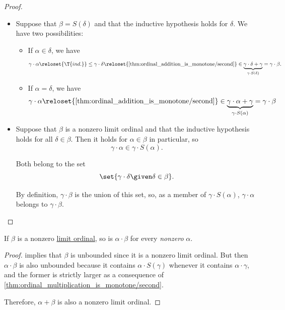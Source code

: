 \begin{proof}
\begin{itemize}
    \item Suppose that \( \beta = S(\delta) \) and that the inductive hypothesis holds for \( \delta \). We have two possibilities:
    \begin{itemize}
      \item If \( \alpha \in \delta \), we have
      \begin{equation*}
        \gamma \cdot \alpha
        \reloset {\T{ind.}} \leq
        \gamma \cdot \delta
        \reloset {\ref{thm:ordinal_addition_is_monotone/second}} \in
        \underbrace{\gamma \cdot \delta + \gamma}_{\gamma \cdot S(\delta)}
        =
        \gamma \cdot \beta.
      \end{equation*}

      \item If \( \alpha = \delta \), we have
      \begin{equation*}
        \gamma \cdot \alpha
        \reloset {\ref{thm:ordinal_addition_is_monotone/second}} \in
        \underbrace{\gamma \cdot \alpha + \gamma}_{\gamma \cdot S(\alpha)}
        =
        \gamma \cdot \beta
      \end{equation*}
    \end{itemize}

    \item Suppose that \( \beta \) is a nonzero limit ordinal and that the inductive hypothesis holds for all \( \delta \in \beta \). Then it holds for \( \alpha \in \beta \) in particular, so
    \begin{equation*}
      \gamma \cdot \alpha \in \gamma \cdot S(\alpha).
    \end{equation*}

    Both belong to the set
    \begin{equation*}
      \set{ \gamma \cdot \delta \given \delta \in \beta }.
    \end{equation*}

    By definition, \( \gamma \cdot \beta \) is the union of this set, so, as a member of \( \gamma \cdot S(\alpha) \), \( \gamma \cdot \alpha \) belongs to \( \gamma \cdot \beta \).
  \end{itemize}
\end{proof}

\begin{lemma}\label{thm:ordinal_multiplication_limit_ordinal}
  If \( \beta \) is a nonzero \hyperref[def:successor_and_limit_ordinal]{limit ordinal}, so is \( \alpha \cdot \beta \) for every \emph{nonzero} \( \alpha \).
\end{lemma}
\begin{proof}
   implies that \( \beta \) is unbounded since it is a nonzero limit ordinal. But then \( \alpha \cdot \beta \) is also unbounded because it contains \( \alpha \cdot S(\gamma) \) whenever it contains \( \alpha \cdot \gamma \), and the former is strictly larger as a consequence of \cref{thm:ordinal_multiplication_is_monotone/second}.

  Therefore, \( \alpha + \beta \) is also a nonzero limit ordinal.
\end{proof}

